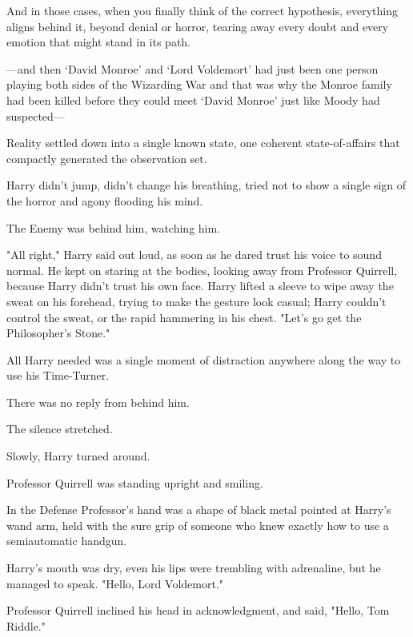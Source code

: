 And in those cases, when you finally think of the correct hypothesis,
everything aligns behind it, beyond denial or horror, tearing away every doubt
and every emotion that might stand in its path.

---and then `David Monroe' and `Lord Voldemort' had just been one person
playing both sides of the Wizarding War and that was why the Monroe family had
been killed before they could meet `David Monroe' just like Moody had
suspected---

Reality settled down into a single known state, one coherent state-of-affairs
that compactly generated the observation set.

Harry didn't jump, didn't change his breathing, tried not to show a single sign
of the horror and agony flooding his mind.

The Enemy was behind him, watching him.

"All right," Harry said out loud, as soon as he dared trust his voice to sound
normal. He kept on staring at the bodies, looking away from Professor Quirrell,
because Harry didn't trust his own face. Harry lifted a sleeve to wipe away the
sweat on his forehead, trying to make the gesture look casual; Harry couldn't
control the sweat, or the rapid hammering in his chest. "Let's go get the
Philosopher's Stone."

All Harry needed was a single moment of distraction anywhere along the way to
use his Time-Turner.

There was no reply from behind him.

The silence stretched.

Slowly, Harry turned around.

Professor Quirrell was standing upright and smiling.

In the Defense Professor's hand was a shape of black metal pointed at Harry's
wand arm, held with the sure grip of someone who knew exactly how to use a
semiautomatic handgun.

Harry's mouth was dry, even his lips were trembling with adrenaline, but he
managed to speak. "Hello, Lord Voldemort."

Professor Quirrell inclined his head in acknowledgment, and said, "Hello, Tom
Riddle."
